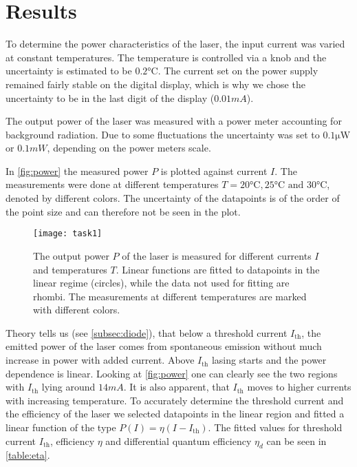 \section{Results}
To determine the power characteristics of the laser, the input current was varied at constant temperatures. The temperature is controlled via a knob and the uncertainty is estimated to be $0.2 \unit{\degreeCelsius}$. The current set on the power supply remained fairly stable on the digital display, which is why we chose the uncertainty to be in the last digit of the display ($0.01 \unit{mA}$). 

The output power of the laser was measured with a power meter accounting for background radiation. Due to some fluctuations the uncertainty was set to $0.1 \unit{\micro\watt}$ or $0.1 \unit{mW}$, depending on the power meters scale.  

In \autoref{fig:power} the measured power $P$ is plotted against current $I$. The measurements were done at different temperatures $T = 20 \unit{\degreeCelsius}, 25 \unit{\degreeCelsius} \text{ and } 30 \unit{\degreeCelsius} $, denoted by different colors. The uncertainty of the datapoints is of the order of the point size and can therefore not be seen in the plot. 

\begin{figure}[H]
	\centering
	\texttt{[image: task1]}
	\caption{The output power $P$ of the laser is measured for different currents $I$ and temperatures $T$. Linear functions are fitted to datapoints in the linear regime (circles), while the data not used for fitting are rhombi. The measurements at different temperatures are marked with different colors.}
	\label{fig:power}
\end{figure}

Theory tells us (see \autoref{subsec:diode}), that below a threshold current $I_\mathrm{th}$, the emitted power of the laser comes from spontaneous emission without much increase in power with added current. Above $I_\mathrm{th}$ lasing starts and the power dependence is linear. Looking at \autoref{fig:power} one can clearly see the two regions with $I_\mathrm{th}$ lying around $14 \unit{mA}$. It is also apparent, that $I_\mathrm{th}$ moves to higher currents with increasing temperature. To accurately determine the threshold current and the efficiency of the laser we selected datapoints in the linear region and fitted a linear function of the type $P(I) = \eta (I - I_\mathrm{th})$. The fitted values for threshold current $I_\mathrm{th}$, efficiency $\eta$ and differential quantum efficiency $\eta_d$ can be seen in \autoref{table:eta}.

